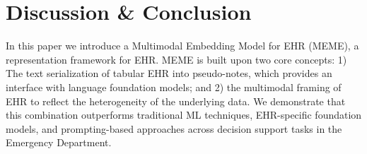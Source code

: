 \documentclass[pmlr]{jmlr}%
\begin{document}
{%





\section{Discussion \& Conclusion}

In this paper we introduce {a Multimodal Embedding Model for EHR (MEME), a representation framework for EHR. MEME is built upon two core concepts: 1) The text serialization of tabular EHR into pseudo-notes, which provides an interface with language foundation models; and 2) the multimodal framing of EHR to reflect the heterogeneity of the underlying data.} \iffalse{an approach for transforming multimodal tabular EHR data into clinical pseudo-notes. This transformation enhances the interpretability of our data inputs and utility of EHR data in various healthcare-related tasks. The pseudo-notes method not only simplifies data handling but also effectively bridges the gap between traditional EHR formats and advanced NLP techniques employed in modern machine learning.} \fi
{We demonstrate that this combination outperforms traditional ML techniques, EHR-specific foundation models, and prompting-based approaches across decision support tasks in the Emergency Department.} 

}
\end{document}
